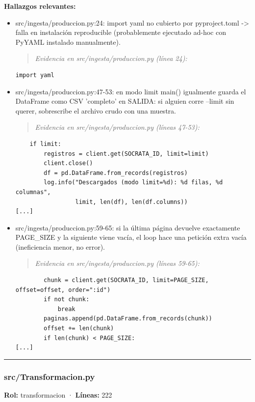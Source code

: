 \textbf{Hallazgos relevantes:}
\begin{itemize}
  \item src/ingesta/produccion.py:24: import yaml no cubierto por pyproject.toml -> falla en instalación reproducible (probablemente ejecutado ad-hoc con PyYAML instalado manualmente).
\begin{quote}\footnotesize\ttfamily
\noindent\emph{Evidencia en src/ingesta/produccion.py (línea 24):}
\end{quote}
\begin{lstlisting}
import yaml
\end{lstlisting}

  \item src/ingesta/produccion.py:47-53: en modo limit main() igualmente guarda el DataFrame como CSV 'completo' en SALIDA: si alguien corre --limit sin querer, sobrescribe el archivo crudo con una muestra.
\begin{quote}\footnotesize\ttfamily
\noindent\emph{Evidencia en src/ingesta/produccion.py (líneas 47-53):}
\end{quote}
\begin{lstlisting}
    if limit:
        registros = client.get(SOCRATA_ID, limit=limit)
        client.close()
        df = pd.DataFrame.from_records(registros)
        log.info("Descargados (modo limit=%d): %d filas, %d columnas",
                 limit, len(df), len(df.columns))
[...]
\end{lstlisting}

  \item src/ingesta/produccion.py:59-65: si la última página devuelve exactamente PAGE\_SIZE y la siguiente viene vacía, el loop hace una petición extra vacía (ineficiencia menor, no error).
\begin{quote}\footnotesize\ttfamily
\noindent\emph{Evidencia en src/ingesta/produccion.py (líneas 59-65):}
\end{quote}
\begin{lstlisting}
        chunk = client.get(SOCRATA_ID, limit=PAGE_SIZE, offset=offset, order=":id")
        if not chunk:
            break
        paginas.append(pd.DataFrame.from_records(chunk))
        offset += len(chunk)
        if len(chunk) < PAGE_SIZE:
[...]
\end{lstlisting}

\end{itemize}

\medskip
\hrule

\subsubsection{src/Transformacion.py}
\textbf{Rol:} transformacion · \textbf{Líneas:} 222

